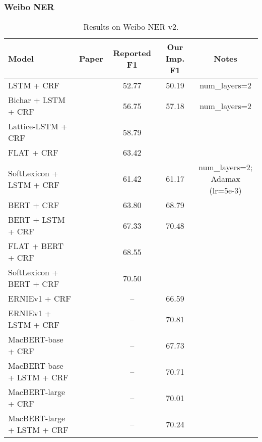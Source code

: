 \documentclass{article}
\begin{document}
\subsubsection{Weibo NER}
\begin{table}[H]
    \centering
    \begin{tabular}{lcccc}
    \toprule
    Model & Paper & Reported F1 & Our Imp. F1 & Notes \\
    \midrule
    LSTM + CRF                  & \citet{zhang2018chinese} & 52.77 & 50.19 & num\_layers=2 \\
    Bichar + LSTM + CRF         & \citet{zhang2018chinese} & 56.75 & 57.18 & num\_layers=2 \\
    Lattice-LSTM + CRF          & \citet{zhang2018chinese} & 58.79 \\
    FLAT + CRF                  & \citet{li2020flat}      & 63.42 \\
    SoftLexicon + LSTM + CRF    & \citet{ma2020simplify}      & 61.42 & 61.17 & \makecell{num\_layers=2; \\Adamax (lr=5e-3)} \\
    \midrule
    BERT + CRF                  & \citet{ma2020simplify}      & 63.80 & 68.79 \\
    BERT + LSTM + CRF           & \citet{ma2020simplify}      & 67.33 & 70.48 \\
    FLAT + BERT + CRF           & \citet{li2020flat}      & 68.55 \\
    SoftLexicon + BERT + CRF    & \citet{ma2020simplify}      & 70.50 \\
    \midrule
    ERNIEv1 + CRF               & \citet{sun2019ernie}     & --    & 66.59 \\
    ERNIEv1 + LSTM + CRF        & \citet{sun2019ernie}     & --    & 70.81 \\
    \midrule
    MacBERT-base + CRF          & \citet{cui2020revisiting}     & --    & 67.73 \\
    MacBERT-base + LSTM + CRF   & \citet{cui2020revisiting}     & --    & 70.71 \\
    MacBERT-large + CRF         & \citet{cui2020revisiting}     & --    & 70.01 \\
    MacBERT-large + LSTM + CRF  & \citet{cui2020revisiting}     & --    & 70.24 \\
    \bottomrule
    \end{tabular}
    \caption{Results on Weibo NER v2.}
\end{table}
\end{document}
